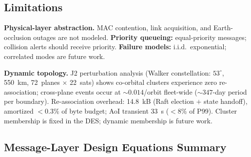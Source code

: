 \documentclass[journal]{IEEEtran}
\begin{document}
\subsection{Limitations}
\label{sec:limitations}

\textbf{Physical-layer abstraction.} MAC contention, link acquisition, and Earth-occlusion outages are not modeled. \textbf{Priority queueing:} equal-priority messages; collision alerts should receive priority. \textbf{Failure models:} i.i.d.\ exponential; correlated modes are future work.

\textbf{Dynamic topology.} J2 perturbation analysis (Walker constellation: $53^\circ$, 550~km, 72~planes $\times$ 22~sats) shows co-orbital clusters experience zero re-association; cross-plane events occur at ${\sim}0.014$/orbit fleet-wide (${\sim}347$-day period per boundary). Re-association overhead: 14.8~kB (Raft election $+$ state handoff), amortized $<$0.3\% of byte budget; AoI transient 33~s ($<$8\% of P99). Cluster membership is fixed in the DES; dynamic membership is future work.


\subsection{Message-Layer Design Equations Summary}
\end{document}
